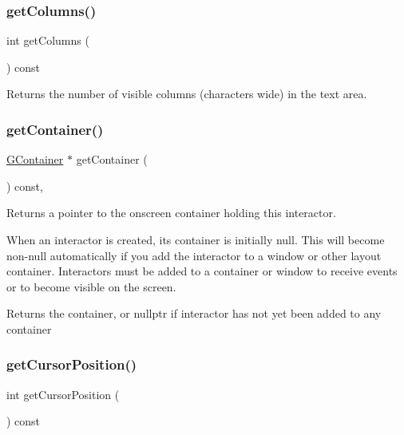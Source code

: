 \subsubsection{\texorpdfstring{get\+Columns()}{getColumns()}}
{\footnotesize\ttfamily int get\+Columns (\begin{DoxyParamCaption}{ }\end{DoxyParamCaption}) const\hspace{0.3cm}{\ttfamily [virtual]}}



Returns the number of visible columns (characters wide) in the text area. 

\mbox{\label{classsgl_1_1GInteractor_a7a6e317c29d61030929b4cd2d1c00fe7}} 
\subsubsection{\texorpdfstring{get\+Container()}{getContainer()}}
{\footnotesize\ttfamily \mbox{\hyperlink{classsgl_1_1GContainer}{G\+Container}} $\ast$ get\+Container (\begin{DoxyParamCaption}{ }\end{DoxyParamCaption}) const\hspace{0.3cm}{\ttfamily [virtual]}, {\ttfamily [inherited]}}



Returns a pointer to the onscreen container holding this interactor. 

When an interactor is created, its container is initially null. This will become non-\/null automatically if you add the interactor to a window or other layout container. Interactors must be added to a container or window to receive events or to become visible on the screen. \begin{DoxyReturn}{Returns}
the container, or nullptr if interactor has not yet been added to any container 
\end{DoxyReturn}
\mbox{\label{classsgl_1_1GTextArea_aa85d2267b4534eb372cd3114ea61ba3b}} 
\subsubsection{\texorpdfstring{get\+Cursor\+Position()}{getCursorPosition()}}
{\footnotesize\ttfamily int get\+Cursor\+Position (\begin{DoxyParamCaption}{ }\end{DoxyParamCaption}) const\hspace{0.3cm}{\ttfamily [virtual]}}



